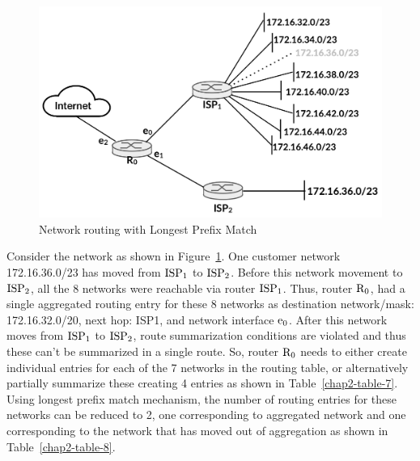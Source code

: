 \begin{multicols}{2}
\begin{figure}[H]
\centering
\includegraphics[scale=.8]{src/Figures/chap2/chap2-fig03.jpg}
\caption{Network routing with Longest Prefix Match}\label{chap2-fig03}
\end{figure}

Consider the network as shown in Figure~\ref{chap2-fig03}. One customer network 172.16.36.0/23 has moved from ${\rm ISP}_{1}$ to ${\rm ISP}_{2}$. Before this network movement to ${\rm ISP}_{2}$, all the 8 networks were reachable via router ${\rm ISP}_{1}$.  Thus, router ${\rm R}_{0}$, had a single aggregated routing entry for these 8 networks as destination network/mask: 172.16.32.0/20, next hop: ISP1, and network interface ${\rm e}_{0}$.  After this network moves from ${\rm ISP}_{1}$ to ${\rm ISP}_{2}$, route summarization conditions are violated and thus these can’t be summarized in a single route. So, router ${\rm R}_{0}$ needs to either create individual entries for each of the 7 networks in the routing table, or alternatively partially summarize these creating 4 entries as shown in Table~\ref{chap2-table-7}. Using longest prefix match mechanism, the number of routing entries for these networks can be reduced to 2, one corresponding to aggregated network and one corresponding to the network that has moved out of aggregation as shown in Table~\ref{chap2-table-8}.
\end{multicols}

